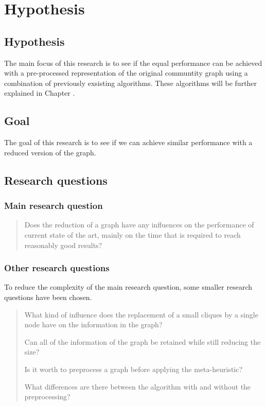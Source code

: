 \section{Hypothesis}
\label{chapter:hypothesis}

\subsection{Hypothesis}
The main focus of this research is to see if the equal performance can be achieved with a pre-processed representation of the original communtity graph using a combination of previously exsisting algorithms.
These algorithms will be further explained in Chapter \cite{chapter:relevantResearch}.


\subsection{Goal}
The goal of this research is to see if we can achieve similar performance with a reduced version of the graph.


\subsection{Research questions}
\subsubsection{Main research question}
\begin{quote}
Does the reduction of a graph have any influences on the performance of current state of the art, mainly on the time that is required to reach reasonably good results?
\end{quote}
\subsubsection{Other research questions}
To reduce the complexity of the main research question, some smaller research questions have been chosen.
\begin{quote}
What kind of influence does the replacement of a small cliques by a single node have on the information in the graph?

Can all of the information of the graph be retained while still reducing the size?

Is it worth to preprocess a graph before applying the meta-heuristic?

What differences are there between the algorithm with and without the preprocessing?
\end{quote}
